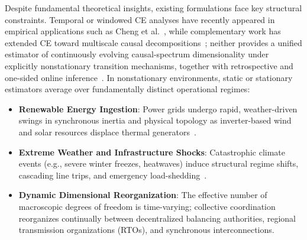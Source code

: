\documentclass[10pt,twocolumn,journal]{article}
\begin{document}
Despite fundamental theoretical insights, existing formulations face key structural constraints. Temporal or windowed CE analyses have recently appeared in empirical applications such as Cheng et al.~\cite{cheng2025information}, while complementary work has extended CE toward multiscale causal decompositions~\cite{hoel2026causal}; neither provides a unified estimator of continuously evolving causal-spectrum dimensionality under explicitly nonstationary transition mechanisms, together with retrospective and one-sided online inference~\cite{dahlhaus1997fitting,yang2025finding,liu2025singular}. In nonstationary environments, static or stationary estimators average over fundamentally distinct operational regimes:
\begin{itemize}
    \item \textbf{Renewable Energy Ingestion}: Power grids undergo rapid, weather-driven swings in synchronous inertia and physical topology as inverter-based wind and solar resources displace thermal generators~\cite{eia2024eia930,machowski2020power}.
    \item \textbf{Extreme Weather and Infrastructure Shocks}: Catastrophic climate events (e.g., severe winter freezes, heatwaves) induce structural regime shifts, cascading line trips, and emergency load-shedding~\cite{menck2014dead,witthaut2016patterns}.
    \item \textbf{Dynamic Dimensional Reorganization}: The effective number of macroscopic degrees of freedom is time-varying; collective coordination reorganizes continually between decentralized balancing authorities, regional transmission organizations (RTOs), and synchronous interconnections.
\end{itemize}
\end{document}

